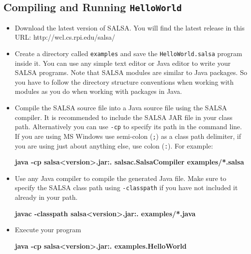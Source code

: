 \subsection{Compiling and Running {\tt HelloWorld}}
\begin{itemize}

\item  Download the latest version of SALSA. You will find the 
latest release in this URL: http://wcl.cs.rpi.edu/salsa/

\item Create a directory called {\tt examples} and save the {\tt HelloWorld.salsa} 
program inside it. You can use any simple text editor or Java editor 
to write your SALSA programs. Note that SALSA modules are similar to 
Java packages. So you have to follow the directory structure conventions when 
working with modules as you do when working with packages in Java.

\item Compile the SALSA source file into a Java source file using the 
SALSA compiler. It is recommended to include the SALSA JAR file in your 
class path. Alternatively you can use {\tt -cp} to specify its path in the 
command line. If you are using MS Windows use semi-colon ({\tt ;}) as a 
class path delimiter, if you are using just about anything else, 
use colon ({\tt :}). For example:

\textbf{java -cp salsa{\textless}version{\textgreater}.jar:. 
salsac.SalsaCompiler examples/*.salsa}

\item Use any Java compiler to compile the generated Java file. 
Make sure to specify the SALSA class path using {\tt -classpath} if 
you have not included it already in your path.

\textbf{javac -classpath salsa{\textless}version{\textgreater}.jar:. examples/*.java}

\item Execute your program

\textbf{java -cp salsa{\textless}version{\textgreater}.jar:. examples.HelloWorld}

\end{itemize}
